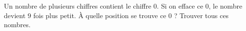 Un nombre de plusieurs chiffres contient le chiffre $0$. Si on efface ce $0$, le nombre devient $9$ fois plus petit. À quelle position se trouve ce $0$ ? Trouver tous ces nombres.

